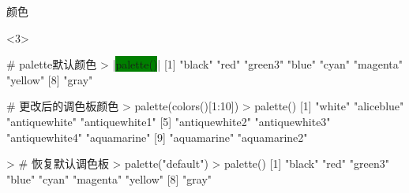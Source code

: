 \begin{frame}[t,fragile]{\subsecname}{颜色}
\begin{overlayarea}{\textwidth}{\textheight}
\begin{onlyenv}<3>
\begin{rcode}
# palette默认颜色
> |\colorbox{green}{palette()}|
[1] "black"   "red"     "green3"  "blue"    "cyan"    "magenta" "yellow" 
[8] "gray" 

# 更改后的调色板颜色
> palette(colors()[1:10])
> palette()
 [1] "white"         "aliceblue"     "antiquewhite"  "antiquewhite1"
 [5] "antiquewhite2" "antiquewhite3" "antiquewhite4" "aquamarine"   
 [9] "aquamarine"    "aquamarine2"  

> # 恢复默认调色板
> palette("default")
> palette()
[1] "black"   "red"     "green3"  "blue"    "cyan"    "magenta" "yellow" 
[8] "gray" 
\end{rcode}
\end{onlyenv}
\end{overlayarea}  
\end{frame}

